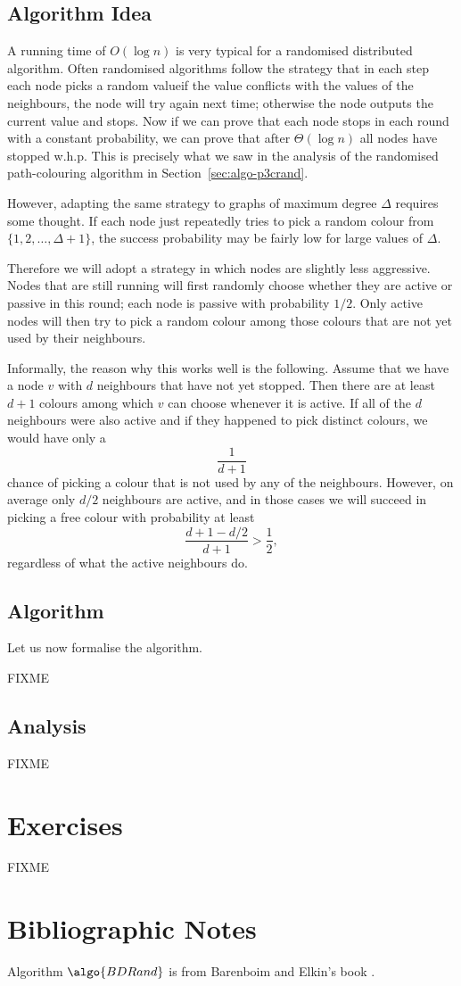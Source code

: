 \subsection{Algorithm Idea}

A running time of $O(\log n)$ is very typical for a randomised distributed algorithm. Often randomised algorithms follow the strategy that in each step each node picks a random value\mydash if the value conflicts with the values of the neighbours, the node will try again next time; otherwise the node outputs the current value and stops. Now if we can prove that each node stops in each round with a constant probability, we can prove that after $\Theta(\log n)$ all nodes have stopped w.h.p. This is precisely what we saw in the analysis of the randomised path-colouring algorithm in Section~\ref{sec:algo-p3crand}.

However, adapting the same strategy to graphs of maximum degree $\Delta$ requires some thought. If each node just repeatedly tries to pick a random colour from $\{1,2,\dotsc,\Delta+1\}$, the success probability may be fairly low for large values of $\Delta$.

Therefore we will adopt a strategy in which nodes are slightly less aggressive. Nodes that are still running will first randomly choose whether they are active or passive in this round; each node is passive with probability $1/2$. Only active nodes will then try to pick a random colour among those colours that are not yet used by their neighbours.

Informally, the reason why this works well is the following. Assume that we have a node $v$ with $d$ neighbours that have not yet stopped. Then there are at least $d+1$ colours among which $v$ can choose whenever it is active. If all of the $d$ neighbours were also active and if they happened to pick distinct colours, we would have only a \[\frac{1}{d+1}\] chance of picking a colour that is not used by any of the neighbours. However, on average only $d/2$ neighbours are active, and in those cases we will succeed in picking a free colour with probability at least \[\frac{d+1 - d/2}{d+1} > \frac{1}{2},\] regardless of what the active neighbours do.


\subsection{Algorithm}

Let us now formalise the algorithm.

FIXME


\subsection{Analysis}

FIXME



\section{Exercises}

\begin{ex}
    FIXME
\end{ex}



\section{Bibliographic Notes}

Algorithm $\algo{BDRand}$ is from Barenboim and Elkin's book \cite[Section 10.1]{barenboim13distributed}.
